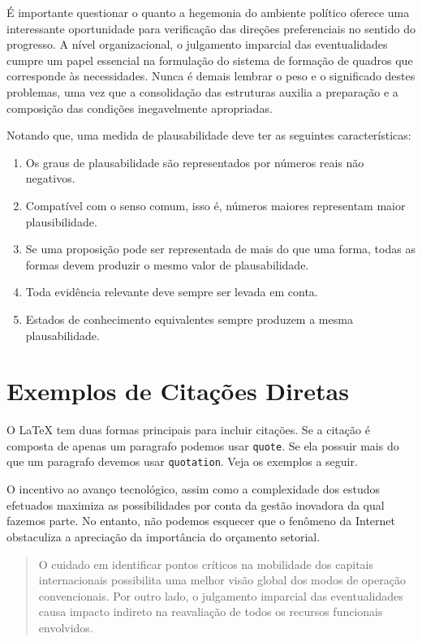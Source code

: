 \documentclass[fleqn]{profmat-cefet}
\begin{document}
É importante questionar o quanto a hegemonia do ambiente político oferece uma
interessante oportunidade para verificação das direções preferenciais no sentido
do progresso. A nível organizacional, o julgamento imparcial das eventualidades
cumpre um papel essencial na formulação do sistema de formação de quadros que
corresponde às necessidades. Nunca é demais lembrar o peso e o significado
destes problemas, uma vez que a consolidação das estruturas auxilia a preparação
e a composição das condições inegavelmente apropriadas. 

Notando que, uma medida de plausabilidade deve ter as seguintes características:
\begin{enumerate}[label=\alph*)]
    \item Os graus de plausabilidade são representados por números reais não negativos.
    \item Compatível com o senso comum, isso é, números maiores representam maior plausibilidade.
    \item Se uma proposição pode ser representada de mais do que uma forma, 
    todas as formas devem produzir o mesmo valor de plausabilidade.
    \item Toda evidência relevante deve sempre ser levada em conta.
    \item Estados de conhecimento equivalentes sempre produzem a mesma plausabilidade.
\end{enumerate}

\section{Exemplos de Citações Diretas}
\label{sec:exemplos_citacoes}

O \LaTeX{} tem duas formas principais para incluir citações. Se a citação é 
composta de apenas um paragrafo podemos usar \lstinline{quote}. Se
ela possuir mais do que um paragrafo devemos usar \lstinline{quotation}.
Veja os exemplos a seguir.

O incentivo ao avanço tecnológico, assim como a complexidade dos estudos
efetuados maximiza as possibilidades por conta da gestão inovadora da qual
fazemos parte.
No entanto, não podemos esquecer que o fenômeno da Internet obstaculiza a
apreciação da importância do orçamento setorial. 

\begin{quote}
    O cuidado em identificar pontos críticos na mobilidade dos capitais
    internacionais possibilita uma melhor visão global dos modos de operação
    convencionais. Por outro lado, o julgamento imparcial das eventualidades causa
    impacto indireto na reavaliação de todos os recursos funcionais envolvidos.
\end{quote}
\end{document}
